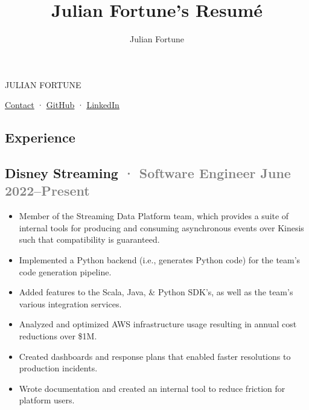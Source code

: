 \documentclass[12pt]{article} %
\title{Julian Fortune's Resumé}
\author{Julian Fortune}
\providecommand{\tightlist}{%
  \setlength{\itemsep}{0pt}\setlength{\parskip}{0pt}}
\let\defaultref\href
\renewcommand{\href}[2]{%
  \defaultref{#1}{\ul{#2}}%
}
\newcommand{\link}[2]{\href{#1}{#2}}
\renewcommand{\emph}[1]{%
  \textcolor{gray}{#1}%
}
\def\separator{ · {}}
\begin{document}
\begin{bfseries}\begin{huge}
  {\selectfont%
    \MakeTextUppercase{Julian Fortune}
  }
\end{huge}\end{bfseries}

  \link{https://julianfortune.com}{Contact}\separator%
    \link{http://github.com/julianfortune}{GitHub}\separator%
\link{http://linkedin.com/in/julianfortune}{LinkedIn}%

%
\begin{paracol}{2}
\begin{raggedright}

\hypertarget{experience}{%
\section{Experience}\label{experience}}

\hypertarget{disney-streaming-software-engineer-june-2022present}{%
\subsection{\texorpdfstring{Disney Streaming \emph{· \small Software
Engineer \hfill June
2022--Present}}{Disney Streaming · Software Engineer June 2022--Present}}\label{disney-streaming-software-engineer-june-2022present}}

\begin{itemize}
\tightlist
\item
  Member of the Streaming Data Platform team, which provides a suite of
  internal tools for producing and consuming asynchronous events over
  Kinesis such that compatibility is guaranteed.
\item
  Implemented a Python backend (i.e., generates Python code) for the
  team's code generation pipeline.
\item
  Added features to the Scala, Java, \& Python SDK's, as well as the
  team's various integration services.
\item
  Analyzed and optimized AWS infrastructure usage resulting in annual
  cost reductions over \$1M.
\item
  Created dashboards and response plans that enabled faster resolutions
  to production incidents.
\item
  Wrote documentation and created an internal tool to reduce friction
  for platform users.
\end{itemize}


\end{raggedright}
\end{paracol}
\end{document}
